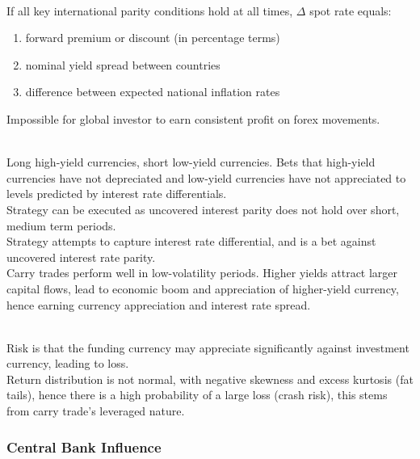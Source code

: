 \begin{remark} \\
If all key international parity conditions hold at all times, $\Delta$ spot rate equals:
\begin{enumerate}[label=\roman*.]
\setlength{\itemsep}{0pt}
\item forward premium or discount (in percentage terms)
\item nominal yield spread between countries
\item difference between expected national inflation rates
\end{enumerate}
Impossible for global investor to earn consistent profit on forex movements.
\end{remark}

\begin{definition} \\
Long high-yield currencies, short low-yield currencies. Bets that high-yield currencies have not depreciated and low-yield currencies have not appreciated to levels predicted by interest rate differentials.\\
Strategy can be executed as uncovered interest parity does not hold over short, medium term periods.\\
Strategy attempts to capture interest rate differential, and is a bet against uncovered interest rate parity.\\
Carry trades perform well in low-volatility periods. Higher yields attract larger capital flows, lead to economic boom and appreciation of higher-yield currency, hence earning currency appreciation and interest rate spread. 
\end{definition}

\begin{remark} \\
Risk is that the funding currency may appreciate significantly against investment currency, leading to loss.\\
Return distribution is not normal, with negative skewness and excess kurtosis (fat tails), hence there is a high probability of a large loss (crash risk), this stems from carry trade's leveraged nature.
\end{remark}

\subsubsection{Central Bank Influence}

